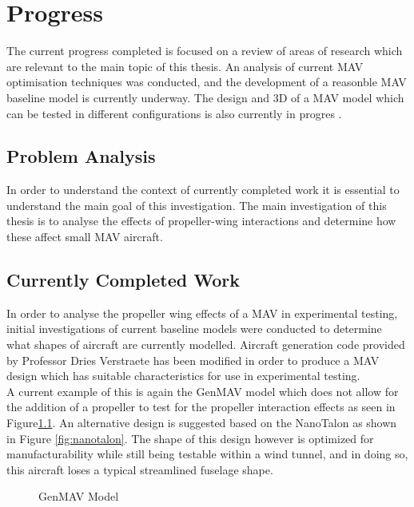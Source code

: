 \graphicspath{{./Figs/}}

\chapter{Progress} 
The current progress completed is focused on a review of areas of research which are relevant to the main topic of this thesis. An analysis of current MAV optimisation techniques was conducted, and the development of a reasonble MAV baseline model is currently underway. The design and 3D of a MAV model which can be tested in different configurations is also currently in progres . 

\section{Problem Analysis}
\label{sec: ProblemAnalysis}
In order to understand the context of currently completed work it is essential to understand the main goal of this investigation. The main investigation of this thesis is to analyse the effects of propeller-wing interactions and determine how these affect small MAV aircraft. 

\section{Currently Completed Work}
\label{sec: completedWork}

In order to analyse the propeller wing effects of a MAV in experimental testing, initial investigations of current baseline models were conducted to determine what shapes of aircraft are currently modelled. Aircraft generation code provided by Professor Dries Verstraete has been modified in order to produce a MAV design which has suitable characteristics for use in experimental testing.\\

A current example of this is again the GenMAV model
\cite{Stewart2007} which does not allow for the addition of a propeller to test for the propeller interaction effects as seen in Figure\ref{fig:genmav}. An alternative design is suggested based on the NanoTalon as shown in Figure \ref{fig:nanotalon}. The shape of this design however is optimized for manufacturability while still being testable within a wind tunnel, and in doing so, this aircraft loses a typical streamlined fuselage shape. \\

\begin{figure}[h!]
    \centering
    \caption{GenMAV Model \cite{Stewart2007}}
    \label{fig:genmav}
\end{figure}

